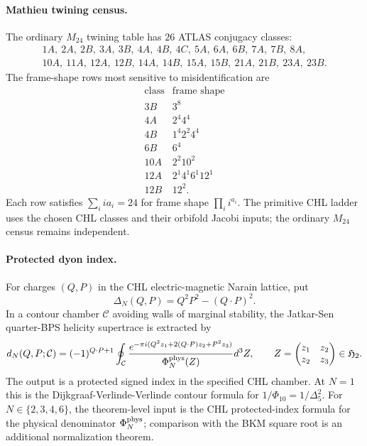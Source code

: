 \paragraph{Mathieu twining census.}
The ordinary \(M_{24}\) twining table has \(26\) ATLAS conjugacy classes:
\[
\begin{gathered}
1A,\ 2A,\ 2B,\ 3A,\ 3B,\ 4A,\ 4B,\ 4C,\ 5A,\ 6A,\ 6B,\ 7A,\ 7B,\ 8A,\\
10A,\ 11A,\ 12A,\ 12B,\ 14A,\ 14B,\ 15A,\ 15B,\ 21A,\ 21B,\ 23A,\ 23B.
\end{gathered}
\]
The frame-shape rows most sensitive to misidentification are
\[
\begin{array}{c|c}
\text{class} & \text{frame shape} \\
\hline
3B & 3^8 \\
4A & 2^4 4^4 \\
4B & 1^4 2^2 4^4 \\
6B & 6^4 \\
10A & 2^2 10^2 \\
12A & 2^1 4^1 6^1 12^1 \\
12B & 12^2 .
\end{array}
\]
Each row satisfies \(\sum_i i a_i=24\) for frame shape
\(\prod_i i^{a_i}\). The primitive CHL ladder uses the chosen CHL
classes and their orbifold Jacobi inputs; the ordinary \(M_{24}\)
census remains independent.

\paragraph{Protected dyon index.}
For charges \((Q,P)\) in the CHL electric-magnetic Narain lattice, put
\[
  \Delta_N(Q,P)=Q^2P^2-(Q\cdot P)^2 .
\]
In a contour chamber \(\mathcal C\) avoiding walls of marginal
stability, the Jatkar-Sen quarter-BPS helicity supertrace is extracted
by
\[
d_N(Q,P;\mathcal C)
=
(-1)^{Q\cdot P+1}
\oint_{\mathcal C}
\frac{
e^{-\pi i(Q^2 z_1+2(Q\cdot P)z_2+P^2 z_3)}
}{
\Phi^{\mathrm{phys}}_N(Z)
}
d^3Z,
\qquad
Z=\begin{pmatrix}z_1&z_2\\ z_2&z_3\end{pmatrix}\in\mathfrak H_2 .
\label{wn:eq:chl-dyon-count}
\]
The output is a protected signed index in the specified CHL chamber. At
\(N=1\) this is the Dijkgraaf-Verlinde-Verlinde contour formula for
\(1/\Phi_{10}=1/\Delta_5^2\). For \(N\in\{2,3,4,6\}\), the theorem-level
input is the CHL protected-index formula for the physical denominator
\(\Phi^{\mathrm{phys}}_N\); comparison with the BKM square root is an additional
normalization theorem.

